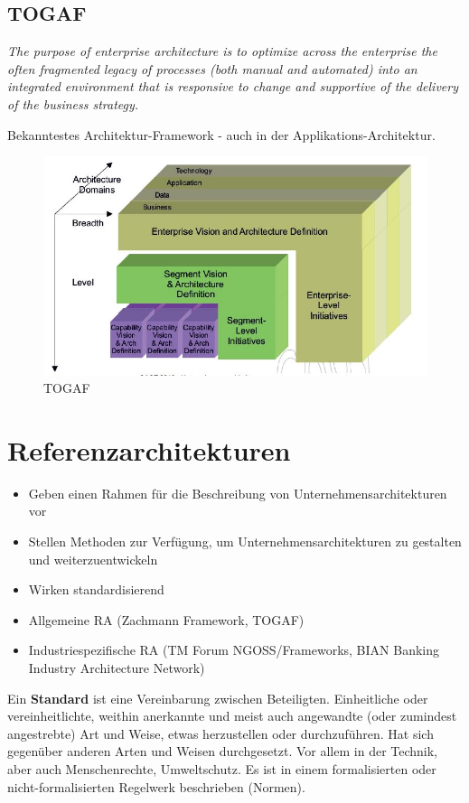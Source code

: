 \subsection{TOGAF}

\textit{The purpose of enterprise architecture is to optimize across the enterprise the often fragmented legacy of processes (both manual and automated) into an integrated environment that is responsive to change and supportive of the delivery of the business strategy.}

Bekanntestes Architektur-Framework - auch in der Applikations-Architektur.

\begin{figure}[h!]
\centering
\includegraphics[width=0.7\linewidth]{fig/togaf}
\caption{TOGAF}
\label{fig:togaf}
\end{figure}

\section{Referenzarchitekturen}

\begin{itemize}
	\item Geben einen Rahmen für die Beschreibung von Unternehmensarchitekturen vor
	\item Stellen Methoden zur Verfügung, um Unternehmensarchitekturen zu gestalten und weiterzuentwickeln
	\item Wirken standardisierend
	\item Allgemeine RA (Zachmann Framework, TOGAF)
	\item Industriespezifische RA (TM Forum NGOSS/Frameworks, BIAN Banking Industry Architecture Network)
\end{itemize}

Ein \textbf{Standard} ist eine Vereinbarung zwischen Beteiligten. Einheitliche oder vereinheitlichte, weithin anerkannte und meist auch angewandte (oder zumindest angestrebte) Art und Weise, etwas herzustellen oder durchzuführen. Hat sich gegenüber anderen Arten und Weisen durchgesetzt. Vor allem in der Technik, aber auch Menschenrechte, Umweltschutz. Es ist in einem formalisierten oder nicht-formalisierten Regelwerk beschrieben (Normen).

